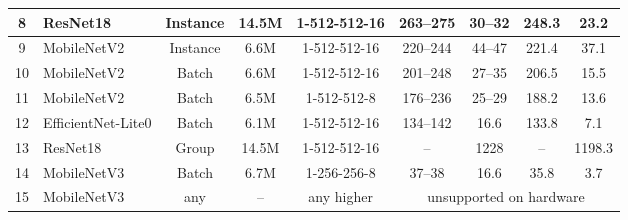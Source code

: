 \begin{table}[!htbp]
\begin{tabularx}{\textwidth}{c|>{\centering\arraybackslash}Xcc|c|cc|cc}
		\hline
		8 & ResNet18
		& Instance
		& 14.5M
		& 1-512-512-16
		& 263--275
		& 30--32
		& 248.3
		& 23.2 \\
		\hline
		9 & MobileNetV2
		& Instance
		& 6.6M
		& 1-512-512-16
		& 220--244
		& 44--47
		& 221.4
		& 37.1 \\
		\hline
		10 & MobileNetV2
		& Batch
		& 6.6M
		& 1-512-512-16
		& 201--248
		& 27--35
		& 206.5
		& 15.5 \\
		\hline
		11 & MobileNetV2
		& Batch
		& 6.5M
		& 1-512-512-8
		& 176--236
		& 25--29
		& 188.2
		& 13.6 \\
		\hline
		12 & EfficientNet-Lite0
		& Batch
		& 6.1M
		& 1-512-512-16
		& 134--142
		& 16.6 \underline{\smash{cap}}
		& 133.8
		& 7.1 \\
		\hline
		13 & ResNet18
		& Group
		& 14.5M
		& 1-512-512-16
		& --
		& 1228
		& --
		& 1198.3 \\
		\hline
		14 & MobileNetV3
		& Batch
		& 6.7M
		& 1-256-256-8 
		& 37--38
		& 16.6 \underline{\smash{cap}} 
		& 35.8
		& 3.7 \\
		\hline
		15 & MobileNetV3
		& any
		& --
		& any higher 
		& \multicolumn{4}{c}{unsupported on hardware}\\
		\hline
%
	\end{tabularx}	
	\centering

\end{table}
